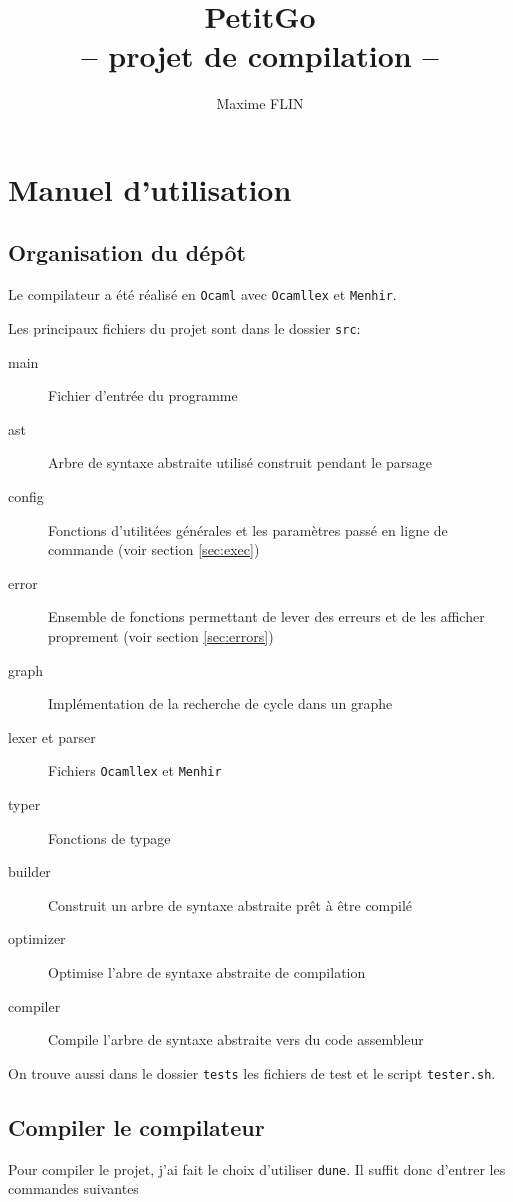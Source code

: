 \documentclass{article}
\title{
  PetitGo \\
  \large -- projet de compilation --}
\author{Maxime FLIN}
\begin{document}
\maketitle

\section{Manuel d'utilisation}
\subsection{Organisation du dépôt}
Le compilateur a été réalisé en \texttt{Ocaml} avec \texttt{Ocamllex} et \texttt{Menhir}.

Les principaux fichiers du projet sont dans le dossier \texttt{src}:

\begin{description}
\item[main] Fichier d'entrée du programme
\item[ast] Arbre de syntaxe abstraite utilisé construit pendant le parsage
\item[config] Fonctions d'utilitées générales et les paramètres passé en ligne de commande (voir section \ref{sec:exec})
\item[error] Ensemble de fonctions permettant de lever des erreurs et de les afficher proprement (voir section \ref{sec:errors})
\item[graph] Implémentation de la recherche de cycle dans un graphe
\item[lexer et parser] Fichiers \texttt{Ocamllex} et \texttt{Menhir}
\item[typer] Fonctions de typage
\item[builder] Construit un arbre de syntaxe abstraite prêt à être compilé
\item[optimizer] Optimise l'abre de syntaxe abstraite de compilation
\item[compiler] Compile l'arbre de syntaxe abstraite vers du code assembleur
\end{description}

On trouve aussi dans le dossier \texttt{tests} les fichiers de test et le script \texttt{tester.sh}.

\subsection{Compiler le compilateur}

Pour compiler le projet, j'ai fait le choix d'utiliser \texttt{dune}. Il suffit donc d'entrer les commandes suivantes
\end{document}
